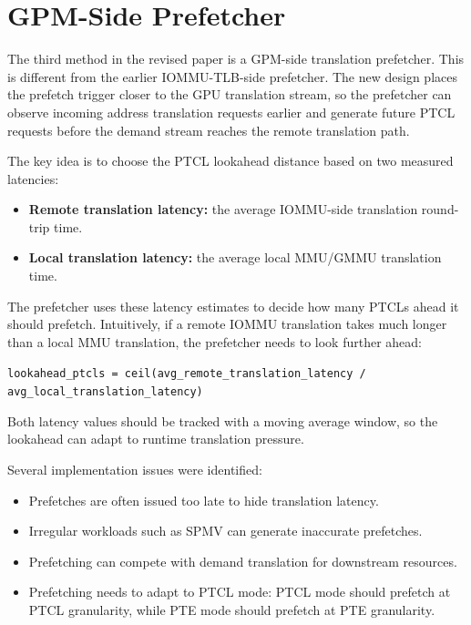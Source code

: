 \documentclass[11pt]{article}
\begin{document}
\section{GPM-Side Prefetcher}

The third method in the revised paper is a GPM-side translation prefetcher. This
is different from the earlier IOMMU-TLB-side prefetcher. The new design places
the prefetch trigger closer to the GPU translation stream, so the prefetcher can
observe incoming address translation requests earlier and generate future PTCL
requests before the demand stream reaches the remote translation path.

The key idea is to choose the PTCL lookahead distance based on two measured
latencies:

\begin{itemize}
  \item \textbf{Remote translation latency:} the average IOMMU-side translation
        round-trip time.
  \item \textbf{Local translation latency:} the average local MMU/GMMU
        translation time.
\end{itemize}

The prefetcher uses these latency estimates to decide how many PTCLs ahead it
should prefetch. Intuitively, if a remote IOMMU translation takes much longer
than a local MMU translation, the prefetcher needs to look further ahead:

\begin{center}
\texttt{lookahead\_ptcls = ceil(avg\_remote\_translation\_latency /
avg\_local\_translation\_latency)}
\end{center}

Both latency values should be tracked with a moving average window, so the
lookahead can adapt to runtime translation pressure.

Several implementation issues were identified:

\begin{itemize}
  \item Prefetches are often issued too late to hide translation latency.
  \item Irregular workloads such as SPMV can generate inaccurate prefetches.
  \item Prefetching can compete with demand translation for downstream resources.
  \item Prefetching needs to adapt to PTCL mode: PTCL mode should prefetch at
        PTCL granularity, while PTE mode should prefetch at PTE granularity.
\end{itemize}
\end{document}
